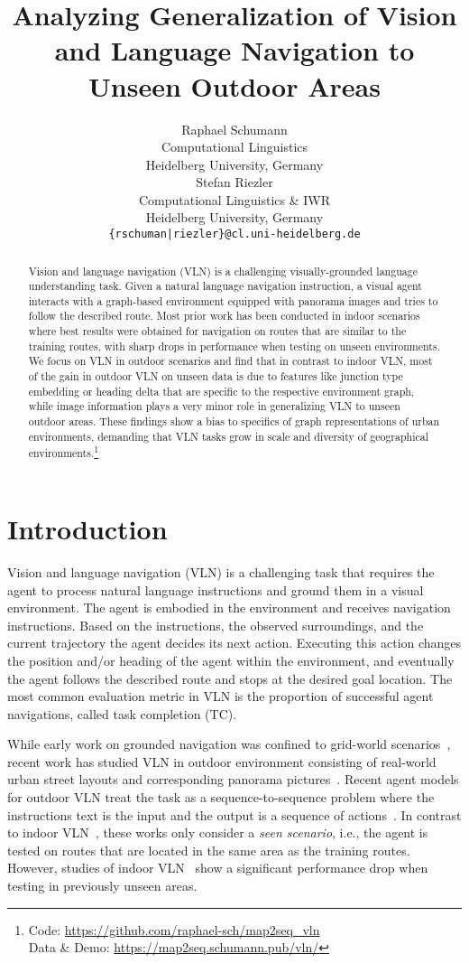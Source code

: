 \documentclass[11pt]{article}
\title{Analyzing Generalization of Vision and Language Navigation to Unseen Outdoor Areas}
\author{Raphael Schumann \\
  Computational Linguistics\\
  Heidelberg University, Germany \\
  \And
  Stefan Riezler \\
  Computational Linguistics \& IWR \\
  Heidelberg University, Germany \\
  \hspace{-7cm}\texttt{\{rschuman|riezler\}@cl.uni-heidelberg.de}}
\begin{document}
\maketitle
\begin{abstract}
Vision and language navigation (VLN) is a challenging visually-grounded language understanding task. Given a natural language navigation instruction, a visual agent interacts with a graph-based environment equipped with panorama images and tries to follow the described route. 
Most prior work has been conducted in indoor scenarios where best results were obtained for navigation on routes that are similar to the training routes, with sharp drops in performance when testing on unseen environments. We focus on VLN in outdoor scenarios and find that in contrast to indoor VLN, most of the gain in outdoor VLN on unseen data is due to features like junction type embedding or heading delta that are specific to the respective environment graph, while image information plays a very minor role in generalizing VLN to unseen outdoor areas. These findings show a bias to specifics of graph representations of urban environments, demanding that VLN tasks grow in scale and diversity of geographical environments.\footnote{Code: \url{https://github.com/raphael-sch/map2seq_vln} \\ Data \& Demo: \url{https://map2seq.schumann.pub/vln/}}
\end{abstract}

\section{Introduction}
Vision and language navigation (VLN) is a challenging task that requires the agent to process natural language instructions and ground them in a visual environment. The agent is embodied in the environment and receives navigation instructions. Based on the instructions, the observed surroundings, and the current trajectory the agent decides its next action. Executing this action changes the position and/or heading of the agent within the environment, and eventually the agent follows the described route and stops at the desired goal location. The most common evaluation metric in VLN is the proportion of successful agent navigations, called task completion (TC). 

While early work on grounded navigation was confined to grid-world scenarios~\cite{walkthetalk, interpret_nlni}, recent work has studied VLN in outdoor environment consisting of real-world urban street layouts and corresponding panorama pictures~\cite{Chen2018Touchdown}. Recent agent models for outdoor VLN treat the task as a sequence-to-sequence problem where the instructions text is the input and the output is a sequence of actions~\cite{Chen2018Touchdown, Xiang2020LearningNavigation, Zhu2020MultimodalNavigation}. In contrast to indoor VLN~\cite{room2room, rxr}, these works only consider a \textit{seen scenario}, i.e., the agent is tested on routes that are located in the same area as the training routes. However, studies of indoor VLN~\cite{Zhang2020DiagnosingNavigation} show a significant performance drop when testing in previously unseen areas. 
\end{document}
